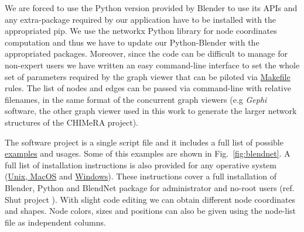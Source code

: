 \documentclass{standalone}
\begin{document}
We are forced to use the \textsf{Python} version provided by \textsf{Blender} to use its APIs and any extra-package required by our application have to be installed with the appropriated \textsf{pip}.
We use the \textsf{networkx} \textsf{Python} library for node coordinates computation and thus we have to update our \textsf{Python}-\textsf{Blender} with the appropriated packages.
Moreover, since the code can be difficult to manage for non-expert users we have written an easy command-line interface to set the whole set of parameters required by the graph viewer that can be piloted via \href{https://github.com/Nico-Curti/BlendNet/blob/master/Makefile}{\textsf{Makefile}} rules.
The list of nodes and edges can be passed via command-line with relative filenames, in the same format of the concurrent graph viewers (e.g \emph{Gephi} software, the other graph viewer used in this work to generate the larger network structures of the \textsf{CHIMeRA} project).

The software project is a single script file and it includes a full list of possible \href{https://github.com/Nico-Curti/BlendNet/blob/master/example}{examples} and usages.
Some of this examples are shown in Fig.~\ref{fig:blendnet}.
A full list of installation instructions is also provided for any operative system (\href{https://github.com/Nico-Curti/BlendNet/blob/master/install.sh}{Unix, MacOS} and \href{https://github.com/Nico-Curti/BlendNet/blob/master/install.ps1}{Windows}).
These instructions cover a full installation of \textsf{Blender}, \textsf{Python} and \textsf{BlendNet} package for administrator and no-root users (ref. \textsf{Shut} project \cite{Shut}).
With slight code editing we can obtain different node coordinates and shapes.
Node colors, sizes and positions can also be given using the node-list file as independent columns.
\end{document}
